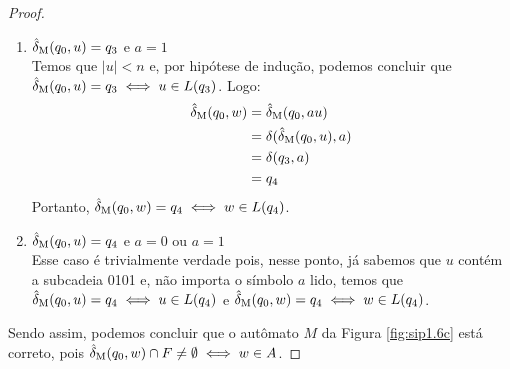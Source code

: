 \begin{proof}
\begin{enumerate}[label=\textbf{(\arabic*)}]
\item $\operatorname{\hat{\delta}_M}(q_0, u) = q_3$ e $a = 1$\\
Temos que $|u| < n$ e, por hipótese de indução, podemos concluir que $\operatorname{\hat{\delta}_M}(q_0, u) = q_3 \iff u \in L(q_3)$. Logo:
\begin{align*}
    \operatorname{\hat{\delta}_M}(q_0, w) &= \operatorname{\hat{\delta}_M}(q_0, au)\\
                    &= \delta(\operatorname{\hat{\delta}_M}(q_0, u), a)\\
                    &= \delta(q_3, a)\\
                    &= q_4
\end{align*}
Portanto, $\operatorname{\hat{\delta}_M}(q_0, w) = q_4 \iff w \in L(q_4)$.

\item $\operatorname{\hat{\delta}_M}(q_0, u) = q_4$ e $a = 0$ ou $a = 1$\\
Esse caso é trivialmente verdade pois, nesse ponto, já sabemos que $u$ contém a subcadeia 0101 e, não importa o símbolo $a$ lido, temos que $\operatorname{\hat{\delta}_M}(q_0, u) = q_4 \iff u \in L(q_4)$ e $\operatorname{\hat{\delta}_M}(q_0, w) = q_4 \iff w \in L(q_4)$.
\end{enumerate}

Sendo assim, podemos concluir que o autômato $M$ da Figura \ref{fig:sip1.6c} está correto, pois $\operatorname{\hat{\delta}_M}(q_0, w) \cap F \neq \emptyset \iff w \in A$.
\end{proof}
